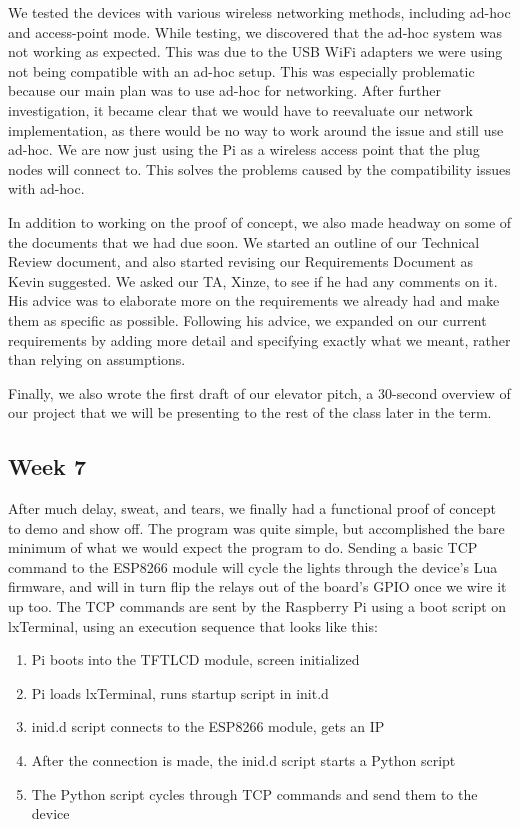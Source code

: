 \documentclass[letterpaper,10pt]{article}
\begin{document}
We tested the devices with various wireless networking methods, including
ad-hoc and access-point mode. While testing, we discovered that the ad-hoc
system was not working as expected. This was due to the USB WiFi adapters we
were using not being compatible with an ad-hoc setup. This was especially
problematic because our main plan was to use ad-hoc for networking. After
further investigation, it became clear that we would have to reevaluate our
network implementation, as there would be no way to work around the issue and
still use ad-hoc. We are now just using the Pi as a wireless access point that
the plug nodes will connect to. This solves the problems caused by the
compatibility issues with ad-hoc.

In addition to working on the proof of concept, we also made headway on some of
the documents that we had due soon. We started an outline of our Technical
Review document, and also started revising our Requirements Document as Kevin
suggested.  We asked our TA, Xinze, to see if he had any comments on it.  His
advice was to elaborate more on the requirements we already had and make them
as specific as possible. Following his advice, we expanded on our current
requirements by adding more detail and specifying exactly what we meant, rather
than relying on assumptions.

Finally, we also wrote the first draft of our elevator pitch, a 30-second
overview of our project that we will be presenting to the rest of the class
later in the term.

\subsection{Week 7}  

After much delay, sweat, and tears, we finally had a functional proof of
concept to demo and show off. The program was quite simple, but accomplished
the bare minimum of what we would expect the program to do.  Sending a basic
TCP command to the ESP8266 module will cycle the lights through the device's
Lua firmware, and will in turn flip the relays out of the board's GPIO once we
wire it up too. The TCP commands are sent by the Raspberry Pi using a boot
script on lxTerminal, using an execution sequence that looks like this:

\begin{enumerate}
    \item Pi boots into the TFTLCD module, screen initialized
    \item Pi loads lxTerminal, runs startup script in init.d
    \item inid.d script connects to the ESP8266 module, gets an IP
    \item After the connection is made, the inid.d script starts a Python
        script
    \item The Python script cycles through TCP commands and send them to the
        device
\end{enumerate}
\end{document}
